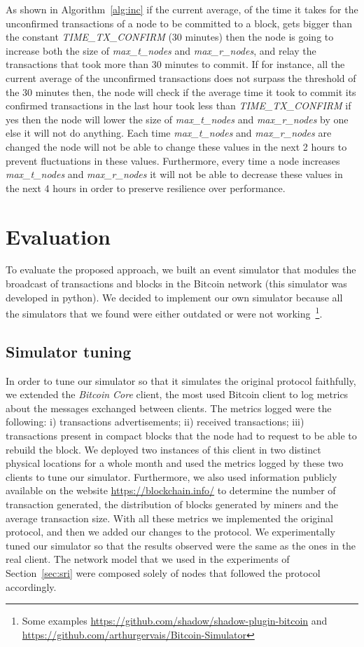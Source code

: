 \documentclass{dads}   %
\begin{document}
As shown in Algorithm~\ref{alg:inc} if the current average, of the time it takes for the unconfirmed transactions of a node to be committed to a block, gets bigger than the constant \textsl{TIME\_TX\_CONFIRM} (30 minutes) then the node is going to increase both the size of \textsl{max\_t\_nodes} and \textsl{max\_r\_nodes}, and relay the transactions that took more than 30 minutes to commit. If for instance, all the current average of the unconfirmed transactions does not surpass the threshold of the 30 minutes then, the node will check if the average time it took to commit its confirmed transactions in the last hour took less than \textsl{TIME\_TX\_CONFIRM} if yes then the node will lower the size of \textsl{max\_t\_nodes} and \textsl{max\_r\_nodes} by one else it will not do anything. Each time \textsl{max\_t\_nodes} and \textsl{max\_r\_nodes} are changed the node will not be able to change these values in the next 2 hours to prevent fluctuations in these values. Furthermore, every time a node increases \textsl{max\_t\_nodes} and \textsl{max\_r\_nodes} it will not be able to decrease these values in the next 4 hours in order to preserve resilience over performance.
\vspace{-3.5mm}

\section{Evaluation}
\label{sec:evaluation}
To evaluate the proposed approach, we built an event simulator that modules the broadcast of transactions and blocks in the Bitcoin network (this simulator was developed in python). We decided to implement our own simulator because all the simulators that we found were either outdated or were not working~\footnote{Some examples \url{https://github.com/shadow/shadow-plugin-bitcoin} and \url{https://github.com/arthurgervais/Bitcoin-Simulator}}. 

\subsection{Simulator tuning}
In order to tune our simulator so that it simulates the original protocol faithfully, we extended the \textsl{Bitcoin Core} client, the most used Bitcoin client to log metrics about the messages exchanged between clients. The metrics logged were the following: i) transactions advertisements; ii) received transactions; iii) transactions present in compact blocks that the node had to request to be able to rebuild the block. We deployed two instances of this client in two distinct physical locations for a whole month and used the metrics logged by these two clients to tune our simulator. Furthermore, we also used information publicly available on the website \url{https://blockchain.info/} to determine the number of transaction generated, the distribution of blocks generated by miners and the average transaction size. With all these metrics we implemented the original protocol, and then we added our changes to the protocol. We experimentally tuned our simulator so that the results observed were the same as the ones in the real client. The network model that we used in the experiments of Section~\ref{sec:sri} were composed solely of nodes that followed the protocol accordingly.
\end{document}

